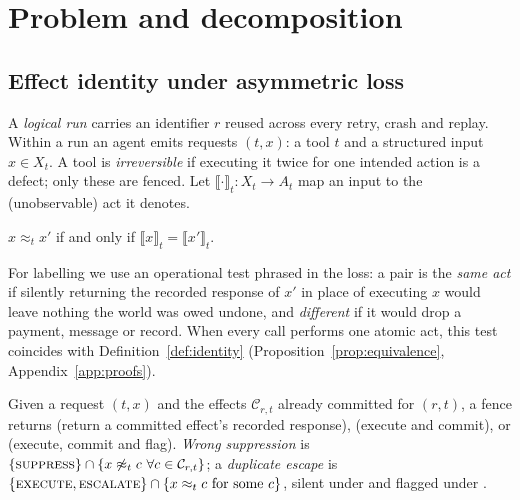 \section{Problem and decomposition}\label{sec:problem}

\subsection{Effect identity under asymmetric loss}

A \emph{logical run} carries an identifier $r$ reused across every retry, crash and replay. Within a run an agent emits requests $(t,x)$: a tool $t$ and a structured input $x\in X_t$. A tool is \emph{irreversible} if executing it twice for one intended action is a defect; only these are fenced. Let $\llbracket\cdot\rrbracket_t:X_t\to A_t$ map an input to the (unobservable) act it denotes.

\begin{definition}\label{def:identity}
$x\approx_t x'$ if and only if $\llbracket x\rrbracket_t=\llbracket x'\rrbracket_t$.
\end{definition}

For labelling we use an operational test phrased in the loss: a pair is the \emph{same act} if silently returning the recorded response of $x'$ in place of executing $x$ would leave nothing the world was owed undone, and \emph{different} if it would drop a payment, message or record. When every call performs one atomic act, this test coincides with Definition~\ref{def:identity} (Proposition~\ref{prop:equivalence}, Appendix~\ref{app:proofs}).

\begin{definition}\label{def:errors}
Given a request $(t,x)$ and the effects $\mathcal{C}_{r,t}$ already committed for $(r,t)$, a fence returns \SUP{} (return a committed effect's recorded response), \EXE{} (execute and commit), or \ESC{} (execute, commit and flag). \emph{Wrong suppression} is $\{\textsc{suppress}\}\cap\{x\not\approx_t c\ \forall c\in\mathcal{C}_{r,t}\}$; a \emph{duplicate escape} is $\{\textsc{execute},\textsc{escalate}\}\cap\{x\approx_t c \text{ for some } c\}$, silent under \EXE{} and flagged under \ESC.
\end{definition}

